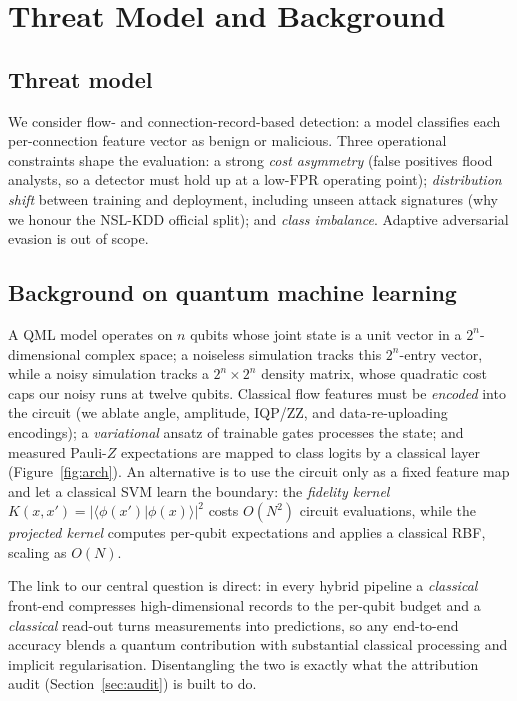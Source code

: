 \documentclass[preprint,11pt]{elsarticle}
\newcommand{\fpr}{\mathrm{FPR}}
\begin{document}
\section{Threat Model and Background}
\subsection{Threat model}
We consider flow- and connection-record-based detection: a model classifies each per-connection
feature vector as benign or malicious. Three operational constraints shape the evaluation: a strong
\emph{cost asymmetry} (false positives flood analysts, so a detector must hold up at a low-$\fpr$
operating point); \emph{distribution shift} between training and deployment, including unseen attack
signatures (why we honour the NSL-KDD official split); and \emph{class imbalance}. Adaptive
adversarial evasion is out of scope.

\subsection{Background on quantum machine learning}
A QML model operates on $n$ qubits whose joint state is a unit vector in a $2^n$-dimensional complex
space; a noiseless simulation tracks this $2^n$-entry vector, while a noisy simulation tracks a
$2^n\times 2^n$ density matrix, whose quadratic cost caps our noisy runs at twelve qubits. Classical
flow features must be \emph{encoded} into the circuit (we ablate angle, amplitude, IQP/ZZ, and
data-re-uploading encodings); a \emph{variational} ansatz of trainable gates processes the state; and
measured Pauli-$Z$ expectations are mapped to class logits by a classical layer
(Figure~\ref{fig:arch}). An alternative is to use the circuit only as a fixed feature map and let a
classical SVM learn the boundary: the \emph{fidelity kernel} $K(x,x')=|\langle\phi(x')|\phi(x)\rangle|^2$
costs $O(N^2)$ circuit evaluations, while the \emph{projected kernel} computes per-qubit expectations
and applies a classical RBF, scaling as $O(N)$.

The link to our central question is direct: in every hybrid pipeline a \emph{classical} front-end
compresses high-dimensional records to the per-qubit budget and a \emph{classical} read-out turns
measurements into predictions, so any end-to-end accuracy blends a quantum contribution with
substantial classical processing and implicit regularisation. Disentangling the two is exactly what
the attribution audit (Section~\ref{sec:audit}) is built to do.
\end{document}
